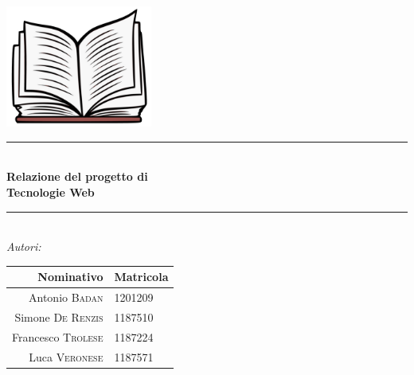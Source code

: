 \documentclass[12pt,a4paper,headings=optiontohead]{article}
\begin{document}
	
	
	\begin{titlepage}
		
		\newcommand{\HRule}{\rule{\linewidth}{0.5mm}} %
		
		\center%
		
		
		
		
		
		\includegraphics[height=4cm]{../img/btllogo.png}\\[0.3cm]
		
		\HRule \\[0.4cm]
		{ \huge \bfseries Relazione del progetto di}\\
		{ \huge \bfseries Tecnologie Web\\[0.15 cm]} %
		\HRule \\[1.5cm]
		
		\emph{\Large{Autori:}}\\
		\renewcommand{\arraystretch}{1.4}
		\begin{center}
			\begin{tabular}{r|l}	
				\textbf{Nominativo} & \textbf{Matricola}\\ \hline
				Antonio \textsc{Badan} & 1201209\\
				Simone \textsc{De Renzis} & 1187510\\
				Francesco \textsc{Trolese} & 1187224\\
				Luca \textsc{Veronese} & 1187571\\
			\end{tabular}
		\end{center}
		

\end{titlepage}
\end{document}

